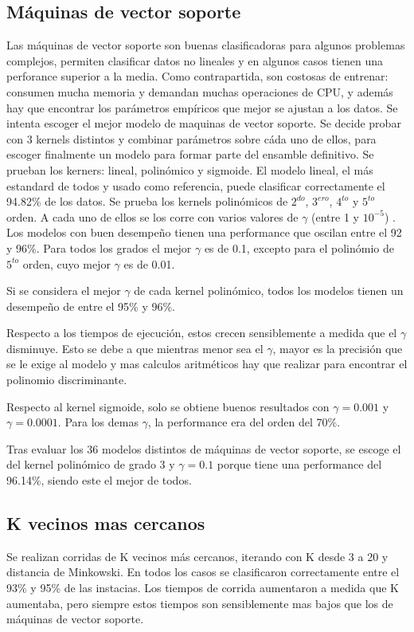 \documentclass[journal]{IEEEtran}
\begin{document}
\subsection{Máquinas de vector soporte}
Las máquinas de vector soporte son buenas clasificadoras para algunos problemas complejos, permiten
clasificar datos no lineales y en algunos casos tienen una perforance superior a la media.
Como contrapartida, son costosas de entrenar: consumen mucha  memoria y
demandan muchas operaciones de CPU, y además hay que encontrar
los parámetros empíricos que mejor se ajustan a los datos.  
Se intenta escoger el mejor modelo de maquinas de vector soporte. Se
decide probar con 3 kernels distintos y combinar parámetros sobre
cáda uno de ellos, para escoger finalmente un modelo para formar parte
del ensamble definitivo. Se prueban los kerners: lineal, polinómico y
sigmoide. El modelo lineal, el más estandard de todos y usado como referencia,
puede clasificar correctamente el 94.82\% de los datos. 
Se prueba los kernels polinómicos de $2^{do}$, $3^{ero}$, $4^{to}$ y $5^{to}$ orden. A cada
uno de ellos se los corre con varios valores de $\gamma$ (entre 1 y $10^{-5}$) . Los modelos
con buen desempeño tienen una performance que oscilan entre el 92 y
96\%. Para todos los grados el mejor $\gamma$ es de 0.1, excepto para el polinómio
de $5^{to}$ orden, cuyo mejor $\gamma$ es de 0.01. 

Si se considera el mejor $\gamma$ de cada kernel polinómico, todos los modelos tienen un
desempeño de entre el 95\% y 96\%.

Respecto a los tiempos de ejecución, estos crecen sensiblemente a medida que el $\gamma$ 
disminuye. Esto se debe a que mientras menor sea el $\gamma$, mayor es la precisión que 
se le exige al modelo y mas calculos aritméticos hay que realizar para encontrar
el polinomio discriminante. 

Respecto al kernel sigmoide, solo se obtiene buenos resultados con $\gamma=0.001$
y $\gamma=0.0001$. Para los demas $\gamma$, la performance era del orden del
70\%.

Tras evaluar los 36 modelos distintos de máquinas de vector soporte, se escoge
el del kernel polinómico de grado 3 y $\gamma=0.1$ porque tiene una performance del
96.14\%, siendo este el mejor de todos.

\subsection{K vecinos mas cercanos}
Se realizan corridas de K vecinos más cercanos, iterando con K desde
3 a 20 y distancia de Minkowski. En todos los casos se clasificaron
correctamente entre el 93\% y 95\% de las instacias. Los tiempos de corrida aumentaron
a medida que K aumentaba, pero siempre estos tiempos son sensiblemente
mas bajos que los de máquinas de vector soporte.
\end{document}

